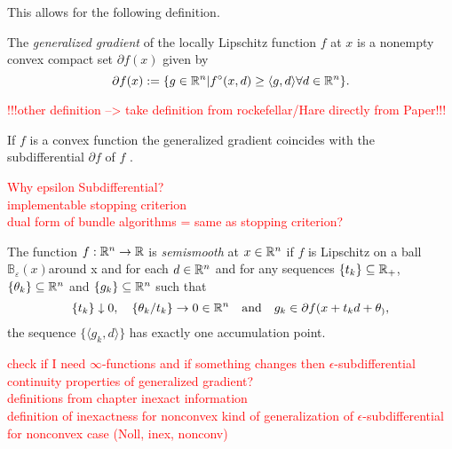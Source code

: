 This allows for the following definition.
\begin{definition} \cite{Clarke1990}
	The \emph{generalized gradient} of the locally Lipschitz function \(f\) at \(x\) is a nonempty convex compact set \(\partial f(x)\) given by
	\[ \partial f(x) := \{g \in \mathbb{R}^n | f^{\circ}(x,d) \geq \langle g,d\rangle \forall d \in \mathbb{R}^n \}. \]
\end{definition}

\textcolor{red}{!!!other definition --> take definition from rockefellar/Hare directly from Paper!!!}

If \(f\) is a convex function the generalized gradient coincides with the subdifferential \(\partial f\) of \(f\) \cite{Clarke1990}.

\textcolor{red}{Why epsilon Subdifferential?\\
implementable stopping criterion \\
dual form of bundle algorithms = same as stopping criterion?}

\begin{definition} \cite{Mifflin1977}
	The function \(f: \mathbb{R}^n \to \mathbb{R}\)  is \emph{semismooth} at \(x \in \mathbb{R}^n\)  if \(f\) is Lipschitz on a ball \(\mathbb{B}_\varepsilon(x)\)around x and for each \(d \in \mathbb{R}^n\) and for any sequences \(\{t_k\} \subseteq \mathbb{R}_{+}\), \(\{\theta_k\} \subseteq \mathbb{R}^n\) and \(\{g_k\} \subseteq \mathbb{R}^n\) such that
	\[ \{t_k\} \downarrow 0, \quad \{\theta_k/t_k\} \to 0 \in \mathbb{R}^n \quad \text{and} \quad g_k \in \partial f(x+t_kd+\theta_), \]
	the sequence  \(\{\langle g_k,d\rangle\}\) has exactly one accumulation point.
\end{definition}

\textcolor{red}{check if I need \(\infty\)-functions and if something changes then}
\textcolor{red}{\(\epsilon\)-subdifferential \\
continuity properties of generalized gradient? \\
definitions from chapter inexact information \\
definition of inexactness for nonconvex kind of generalization of \(\epsilon\)-subdifferential for nonconvex case (Noll, inex, nonconv)}
